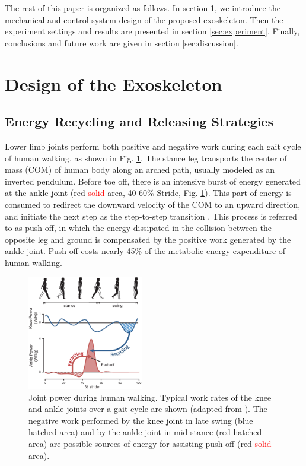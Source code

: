 \documentclass[twocolumn,cleanfoot,10pt]{asme2ej}
\begin{document}
The rest of this paper is organized as follows.
In section \ref{sec:design}, we introduce the mechanical and control system design of the proposed exoskeleton.
Then the experiment settings and results are presented in section \ref{sec:experiment}.
Finally, conclusions and future work are given in section \ref{sec:discussion}.


\section{Design of the Exoskeleton}
\label{sec:design}

\subsection{Energy Recycling and Releasing Strategies}
\label{subsec:Biomechanics}

Lower limb joints perform both positive and negative work during each gait cycle of human walking, as shown in Fig. \ref{fig:work}.
The stance leg transports the center of mass (COM) of human body along an arched path, usually modeled as an inverted pendulum\cite{RN13}.
Before toe off, there is an intensive burst of energy generated at the ankle joint (red \textcolor{red}{solid} area, 40-60\% Stride, Fig. \ref{fig:work}).
This part of energy is consumed to redirect the downward velocity of the COM to an upward direction, and initiate the next step as the step-to-step transition \cite{RN14}.
This process is referred to as push-off, in which the energy dissipated in the collision between the opposite leg and ground is compensated by the positive work generated by the ankle joint.
Push-off costs nearly 45\% of the metabolic energy expenditure of human walking\cite{RN15}.

\begin{figure}[b]
	\centering
	\includegraphics[width=0.45\textwidth]{Figure1.eps}
	\caption{Joint power during human walking.
	Typical work rates of the knee and ankle joints over a gait cycle are shown (adapted from \cite{RN2}).
	The negative work performed by the knee joint in late swing (blue hatched area) and by the ankle joint in mid-stance (red hatched area) are possible sources of energy for assisting push-off (red \textcolor{red}{solid} area).}
	\label{fig:work}
\end{figure}
\end{document}
